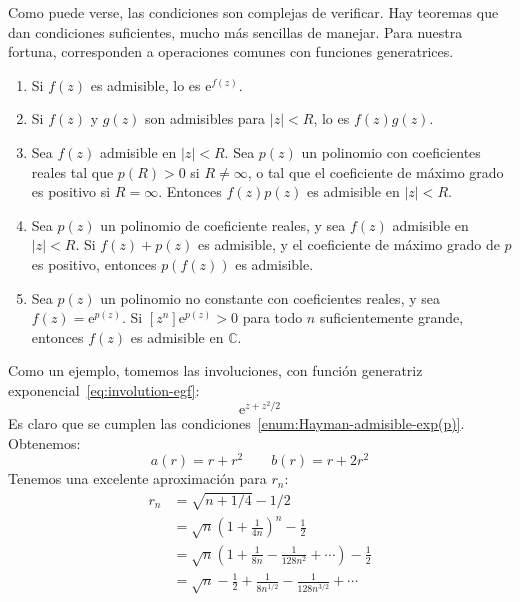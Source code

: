   Como puede verse,
  las condiciones son complejas de verificar.
  Hay teoremas que dan condiciones suficientes,
  mucho más sencillas de manejar.
  Para nuestra fortuna,
  corresponden a operaciones comunes con funciones generatrices.%
  \begin{enumerate}[label=(\Alph*), ref=(\Alph*)]
  \item
    \label{enum:Hayman-admisible-exp(f)}
    Si \(f(z)\) es admisible,
    lo es \(\mathrm{e}^{f(z)}\).
  \item
    \label{enum:Hayman-admisible-fg}
    Si \(f(z)\) y \(g(z)\)
    son admisibles para \(\lvert z \rvert < R\),
    lo es \(f(z) g(z)\).
  \item
    \label{enum:Hayman-admisible-fp}
    Sea \(f(z)\) admisible en \(\lvert z \rvert < R\).
    Sea \(p(z)\) un polinomio con coeficientes reales
    tal que \(p(R) > 0\) si \(R \ne \infty\),
    o tal que el coeficiente de máximo grado
    es positivo si \(R = \infty\).
    Entonces \(f(z) p(z)\) es admisible en \(\lvert z \rvert < R\).
  \item
    \label{enum:Hayman-admisible-p(f)}
    Sea \(p(z)\) un polinomio de coeficiente reales,
    y sea \(f(z)\) admisible en \(\lvert z \rvert < R\).
    Si \(f(z) + p(z)\) es admisible,
    y el coeficiente de máximo grado de \(p\) es positivo,
    entonces \(p(f(z))\) es admisible.
  \item
    \label{enum:Hayman-admisible-exp(p)}
    Sea \(p(z)\) un polinomio no constante con coeficientes reales,
    y sea \(f(z) = \mathrm{e}^{p(z)}\).
    Si \(\left[ z^n \right] \mathrm{e}^{p(z)} > 0\)
    para todo \(n\) suficientemente grande,
    entonces \(f(z)\) es admisible en \(\mathbb{C}\).
  \end{enumerate}
  Como un ejemplo,
  tomemos las involuciones,
  con función generatriz exponencial~\eqref{eq:involution-egf}:
  \begin{equation*}
    \mathrm{e}^{z + z^2 / 2}
  \end{equation*}
  Es claro
  que se cumplen las condiciones~\ref{enum:Hayman-admisible-exp(p)}.
  Obtenemos:
  \begin{equation*}
    a(r)
      = r + r^2
    \qquad
    b(r)
      = r + 2 r^2
  \end{equation*}
  Tenemos una excelente aproximación para \(r_n\):
  \begin{align*}
    r_n
      &= \sqrt{n + 1/4} - 1/2 \\
      &= \sqrt{n}
	   \left( 1 + \frac{1}{4 n} \right)^n - \frac{1}{2} \\
      &= \sqrt{n}
	   \left(
	     1 + \frac{1}{8 n} - \frac{1}{128 n^2} + \dotsb
	   \right)
	   - \frac{1}{2} \\
      &= \sqrt{n}
	   - \frac{1}{2}
	   + \frac{1}{8 n^{1/2}}
	   - \frac{1}{128 n^{3/2}}
	   + \dotsb
  \end{align*}
